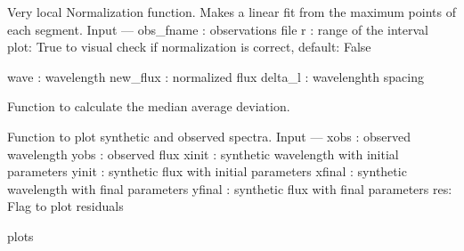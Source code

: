 \documentclass[letterpaper,10pt,english]{sphinxmanual}
\begin{document}

\begin{fulllineitems}
\label{\detokenize{index:FASMA.observations.local_norm}}
Very local Normalization function. Makes a linear fit from the maximum points
of each segment.
Input
—\textendash{}
obs\_fname : observations file
r : range of the interval
plot: True to visual check if normalization is correct, default: False

wave : wavelength
new\_flux : normalized flux
delta\_l : wavelenghth spacing

\end{fulllineitems}


\begin{fulllineitems}
\label{\detokenize{index:FASMA.observations.mad}}
Function to calculate the median average deviation.

\end{fulllineitems}


\begin{fulllineitems}
\label{\detokenize{index:FASMA.observations.plot}}
Function to plot synthetic and observed spectra.
Input
—\textendash{}
xobs : observed wavelength
yobs : observed flux
xinit : synthetic wavelength with initial parameters
yinit : synthetic flux with initial parameters
xfinal : synthetic wavelength with final parameters
yfinal : synthetic flux with final parameters
res: Flag to plot residuals

plots

\end{fulllineitems}
\end{document}
